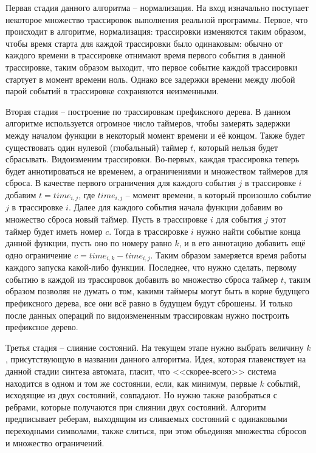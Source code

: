 \documentclass[times,specification,annotation]{itmo-student-thesis}
\begin{document}
Первая стадия данного алгоритма -- нормализация. На вход изначально поступает некоторое множество трассировок выполнения реальной программы. Первое, что происходит в алгоритме, нормализация:
трассировки изменяются таким образом, чтобы время старта для каждой трассировки было одинаковым: обычно от каждого времени в трассировке отнимают время первого события
в данной трассировке, таким образом выходит, что первое событие каждой трассировки стартует в момент времени ноль. Однако все задержки времени между любой парой событий в трассировке
сохраняются неизменными. 

Вторая стадия -- построение по трассировкам префиксного дерева. В данном алгоритме используется огромное число таймеров, чтобы замерять задержки между началом функции в некоторый
момент времени и её концом. Также будет существовать один нулевой (глобальный) таймер $t$, который нельзя будет сбрасывать. Видоизменим трассировки. 
Во-первых, каждая трассировка теперь будет аннотироваться не временем, а ограничениями и множеством таймеров для сброса. В качестве первого ограничения для каждого события $j$ в трассировке $i$
добавим $t = time_{i, j}$, где $time_{i, j}$ -- момент времени, в который произошло событие $j$ в трассировке $i$. Далее для каждого события начала функции добавим во множество сброса новый
таймер. Пусть в трассировке $i$ для события $j$ этот таймер будет иметь номер $c$. Тогда в трассировке $i$ нужно найти событие конца данной функции, пусть оно по номеру равно $k$, и в его
аннотацию добавить ещё одно ограничение $c = time_{i, k} - time_{i, j}$. Таким образом замеряется время работы каждого запуска какой-либо функции. Последнее, что нужно сделать,
первому событию в каждой из трассировок добавить во множество сброса таймер $t$, таким образом позволяя не думать о том, какими таймеры могут быть в корне будущего префиксного дерева, все они всё равно
в будущем будут сброшены. И только после данных операций по видоизмененным трассировкам нужно построить префиксное дерево.

Третья стадия -- слияние состояний. На текущем этапе нужно выбрать величину $k$, присутствующую в названии данного алгоритма. Идея, которая главенствует на данной стадии синтеза автомата,
гласит, что <<скорее-всего>> система находится в одном и том же состоянии, если, как минимум, первые $k$ событий, исходящие из двух состояний, совпадают. Но нужно также разобраться с ребрами, которые
получаются при слиянии двух состояний. Алгоритм предписывает реберам, выходящим из сливаемых состояний с одинаковыми переходными символами, также слиться, при этом объединяя множества сбросов и
множество ограничений. 
\end{document}

